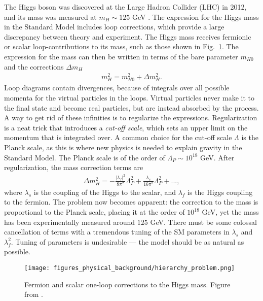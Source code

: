 \documentclass[twoside,english]{uiofysmaster}
\begin{document}
The Higgs boson was discovered at the Large Hadron Collider (LHC) in 2012, and its mass was measured at $m_H \sim 125$ GeV \cite{20121}. The expression for the Higgs mass in the Standard Model includes loop corrections, which provide a large discrepancy between theory and experiment. The Higgs mass receives fermionic or scalar loop-contributions to its mass, such as those shown in Fig.~\ref{Fig:: Phys. bac.: Higgs mass contributions}. The expression for the mass can then be written in terms of the bare parameter $m_{H0}$ and the corrections $\Delta m_H$
\begin{align*}
m_H^2 = m_{H0}^2 + \Delta m_H^2.
\end{align*}
Loop diagrams contain divergences, because of integrals over all possible momenta for the virtual particles in the loops. Virtual particles never make it to the final state and become real particles, but are instead absorbed by the process. A way to get rid of these infinities is to regularize the expressions. Regularization is a neat trick that introduces a \textit{cut-off scale}, which sets an upper limit on the momentum that is integrated over. A common choice for the cut-off scale $\Lambda$ is the Planck scale, as this is where new physics is needed to explain gravity in the Standard Model. The Planck scale is of the order of $\Lambda_P \sim 10^{18}$ GeV. After regularization, the mass correction terms are
\begin{align}
\Delta m_H^2 = - \frac{|\lambda_f|^2}{8\pi^2} \Lambda_P^2 + \frac{\lambda_s}{16\pi^2} \Lambda_P^2 +...,
\end{align}
where $\lambda_s$ is the coupling of the Higgs to the scalar, and $\lambda_f$ is the Higgs coupling to the fermion. The problem now becomes apparent: the correction to the mass is proportional to the Planck scale, placing it at the order of $10^{18}$ GeV, yet the mass has been experimentally measured around $125$ GeV. There must be some colossal cancellation of terms with a tremendous tuning of the SM parameters in $\lambda_s$ and $\lambda_f^2$. Tuning of parameters is undesirable --- the model should be as natural as possible. 

\begin{figure}[H]
\centering
\texttt{[image: figures\_physical\_background/hierarchy\_problem.png]}
\caption{Fermion and scalar one-loop corrections to the Higgs mass. Figure from \cite{batzing2017lecture}.}
\label{Fig:: Phys. bac.: Higgs mass contributions}
\end{figure}
\end{document}
